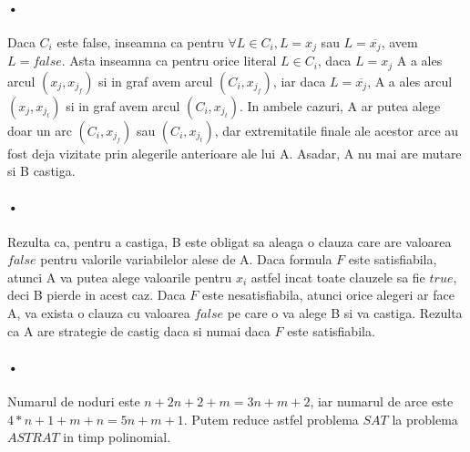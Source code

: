 \documentclass[paper=a4, fontsize=11pt]{scrartcl}
\begin{document}
\paragraph{•}
Daca $C_i$ este false, inseamna ca pentru $\forall L\in C_i, L=x_j$ sau $L=\overline{x_j}$, avem $L=false$. Asta inseamna ca pentru orice literal $L \in C_i$, daca $L=x_j$ A a ales arcul $(x_j, x_{j_f})$ si in graf avem arcul $(C_i, x_{j_f})$, iar daca $L=\overline{x_j}$, A a ales arcul $(x_j, x_{j_t})$ si in graf avem arcul $(C_i, x_{j_t})$. In ambele cazuri, A ar putea alege doar un arc $(C_i, x_{j_f})$ sau $(C_i, x_{j_t})$, dar extremitatile finale ale acestor arce au fost deja vizitate prin alegerile anterioare ale lui A. Asadar, A nu mai are mutare si B castiga.
\paragraph{•}
Rezulta ca, pentru a castiga, B este obligat sa aleaga o clauza care are valoarea $false$ pentru valorile variabilelor alese de A. Daca formula $F$ este satisfiabila, atunci A va putea alege valoarile pentru $x_i$ astfel incat toate clauzele sa fie $true$, deci B pierde in acest caz. Daca $F$ este nesatisfiabila, atunci orice alegeri ar face A, va exista o clauza cu valoarea $false$ pe care o va alege B si va castiga. Rezulta ca A are strategie de castig daca si numai daca $F$ este satisfiabila.
\paragraph{•}
Numarul de noduri este $n+2n+2+m=3n+m+2$, iar numarul de arce este $4*n+1+m+n = 5n+m+1$. Putem reduce astfel problema $SAT$ la problema $ASTRAT$ in timp polinomial.
\end{document}
